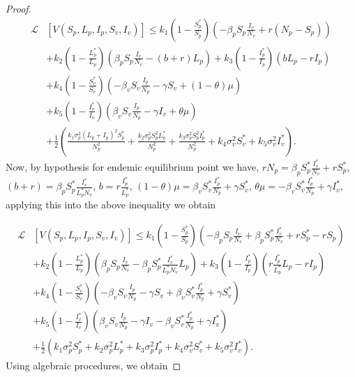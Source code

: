 \begin{proof}
	\begin{align*}
		\mathcal{L}&[V(S_p,L_p,I_p,S_v,I_v)]\leq 
		k_1\left(1-\frac{S_p^*}{S_p}\right)\left(-\beta_p S_p\frac{I_v}{N_v}+r(N_p-S_p)\right)\\
		&+
		k_2\left(1-\frac{L_p^*}{L_p}\right)\left(\beta_p S_p\frac{I_v}{N_v}-(b+r)L_p\right)
		+
		k_3\left(1-\frac{I_p^*}{I_p}\right)\left(bL_p-rI_p\right)\\
		&+
		k_4\left(1-\frac{S_v^*}{S_v}\right)\left(-\beta_v S_v\frac{I_p}{N_p}-\gamma S_v +(1-\theta)\mu\right)\\
		&+
		k_5\left(1-\frac{I_v^*}{I_v}\right)\left(\beta_v S_v\frac{I_p}{N_p}-\gamma I_v+\theta\mu\right)\\
		&+
		\frac{1}{2}\left(\frac{k_1\sigma_p^2(L_p+I_p)^2S_p^*}{N^2_p}+\frac{k_2\sigma_p^2S_p^2 L_p^*}{N^2_p}+\frac{k_3\sigma_p^2S_p^2 I_p^*}{N^2_p}
		+
		k_4\sigma_v^2S_v^*+k_5\sigma_v^2I_v^*\right).
	\end{align*}
%	
	 Now, by hypothesis for endemic equilibrium point we have, $rN_p=\beta_p S^*_p\frac{I^*_v}{N_v}+rS^*_p$, $(b+r)=\beta_p S^*_p\frac{I^*_v}{L_p^*N_v}$, $b = r\frac{I^*_p}{L^*_p}$, $(1-\theta)\mu =\beta_v S^*_v\frac{I^*_p}{N_p}+\gamma S^*_v$, $\theta\mu =-\beta_v S^*_v\frac{I^*_p}{N_p}+\gamma I^*_v$, applying this into the above inequality we obtain
	
	\begin{align*}
		\mathcal{L}&[V(S_p,L_p,I_p,S_v,I_v)]\leq 
			k_1\left(1-\frac{S_p^*}{S_p}\right)\left(-\beta_p S_p\frac{I_v}{N_v}+\beta_p S^*_p\frac{I^*_v}{N_v}+rS^*_p-rS_p\right)\\
		&+
			k_2\left(1-\frac{L_p^*}{L_p}\right)\left(\beta_p S_p\frac{I_v}{N_v}-\beta_p S^*_p\frac{I^*_v}{L_p^*N_v}L_p\right)
		+
			k_3\left(1-\frac{I_p^*}{I_p}\right)\left(r\frac{I^*_p}{L^*_p}L_p-rI_p\right)\\
		&+
			k_4\left(1-\frac{S_v^*}{S_v}\right)\left(-\beta_v S_v\frac{I_p}{N_p}-\gamma S_v +\beta_v S^*_v\frac{I^*_p}{N_p}+\gamma S^*_v\right)\\
		&+
			k_5\left(1-\frac{I_v^*}{I_v}\right)\left(\beta_v S_v\frac{I_p}{N_p}-\gamma I_v-\beta_v S^*_v\frac{I^*_p}{N_p}+\gamma I^*_v\right)\\
		&+
			\frac{1}{2}\left(k_1\sigma_p^2S_p^*+k_2\sigma_p^2 L_p^*+k_3\sigma_p^2I_p^*+k_4\sigma_v^2S_v^*+k_5\sigma_v^2I_v^*\right).
	\end{align*}
%
	Using algebraic procedures, we obtain
	

\end{proof}
